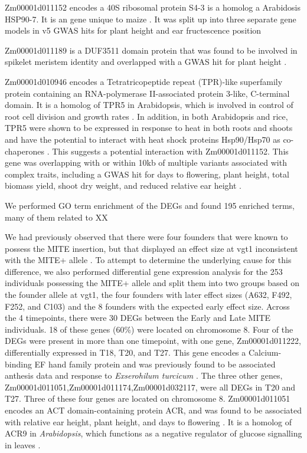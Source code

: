 \documentclass[article,9pt,twocolumn,twoside]{rilabRxiv}
\begin{document}
Zm00001d011152 encodes a 40S ribosomal protein S4-3 is a homolog a Arabidosis HSP90-7.
It is an gene unique to maize \citep{Arendsee}. 
It was split up into three separate gene models in v5
GWAS hits for plant height and ear fructescence position \citep{Peiffer,Peiffer2}

Zm00001d011189 is a DUF3511 domain protein that was found to be involved in spikelet meristem identity \citep{Wang4} and overlapped with a GWAS hit for plant height \citep{Hu}.

Zm00001d010946 encodes a Tetratricopeptide repeat (TPR)-like superfamily protein containing an RNA-polymerase II-associated protein 3-like, C-terminal domain.
It is a homolog of TPR5 in Arabidopsis, which is involved in control of root cell division and growth rates \citep{Sotta}.
In addition, in both Arabidopsis and rice, TPR5 were shown to be expressed in response to heat in both roots and shoots and have the potential to interact with heat shock proteins Hsp90/Hsp70 as co-chaperones \citep{Prasad}. 
This suggests a potential interaction with Zm00001d011152.
This gene was overlapping with or within 10kb of multiple variants associated with complex traits, including a GWAS hit for days to flowering, plant height, total biomass yield, shoot dry weight, and reduced relative ear height \citep{Li6,vanInghelandt,Wang5,Wu}.

We performed GO term enrichment of the DEGs and found 195 enriched terms, many of them related to XX

We had previously observed that there were four founders that were known to possess the MITE insertion, but that displayed an effect size at vgt1 inconsistent with the MITE+ allele \citep{Odell}.
To attempt to determine the underlying cause for this difference, we also performed differential gene expression analysis for the 253 individuals possessing the MITE+ allele and split them into two groups based on the founder allele at vgt1, the four founders with later effect sizes (A632, F492, F252, and C103) and the 8 founders with the expected early effect size.
Across the 4 timepoints, there were 30 DEGs between the Early and Late MITE individuals.
18 of these genes (60\%) were located on chromosome 8.
Four of the DEGs were present in more than one timepoint, with one gene, Zm00001d011222, differentially expressed in T18, T20, and T27.
This gene encodes a Calcium-binding EF hand family protein and was previously found to be associated anthesis data and response to \textit{Exserohilum turcicum} \citep{Wallace,Peiffer2}.
The three other genes, Zm00001d011051,Zm00001d011174,Zm00001d032117, were all DEGs in T20 and T27. 
Three of these four genes are located on chromosome 8.
Zm00001d011051 encodes an  ACT domain-containing protein ACR, and was found to be associated with relative ear height, plant height, and days to flowering \citep{Wallace,Li4,Peiffer}.
It is a homolog of ACR9 in \textit{Arabidopsis}, which functions as a negative regulator of glucose signalling in leaves \citep{Liao}.
\end{document}
